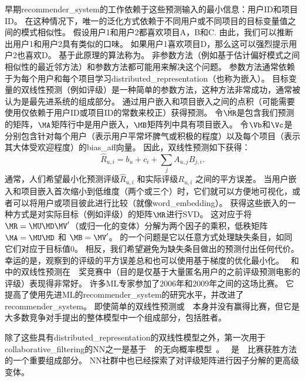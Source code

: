 早期\gls{recommender_system}的工作依赖于这些预测输入的最小信息：用户ID和项目ID。
在这种情况下，唯一的泛化方式依赖于不同用户或不同项目的目标变量值之间的模式相似性。
假设用户1和用户2都喜欢项目A，B和C.
由此，我们可以推断出用户1和用户2具有类似的口味。
如果用户1喜欢项目D，那么这可以强烈提示用户2也喜欢D。
基于此原理的算法称为。
非参数方法（例如基于估计偏好模式之间相似性的最近邻方法）和参数方法都可能用来解决这个问题。
参数方法通常依赖于为每个用户和每个项目学习\gls{distributed_representation}（也称为嵌入）。
目标变量的双线性预测（例如评级）是一种简单的参数方法，这种方法非常成功，通常被认为是最先进系统的组成部分。
通过用户嵌入和项目嵌入之间的点积（可能需要使用仅依赖于用户ID或项目ID的常数来校正）获得预测。
令$\hat{\MR}$是包含我们预测的矩阵，$\MA$矩阵行中是用户嵌入，$\MB$矩阵列中具有项目嵌入。
令$\Vb$和$\Vc$是分别包含针对每个用户（表示用户平常坏脾气或积极的程度）以及每个项目（表示其大体受欢迎程度）的\gls{bias_aff}向量。
因此，双线性预测如下获得：
\begin{equation}
\label{eq:bilinear-prediction}
 \hat{R}_{u,i} = b_u + c_i + \sum_j A_{u,j} B_{j,i}.
\end{equation}
通常，人们希望最小化预测评级$\hat{R}_{u,i}$ 和实际评级${R}_{u,i}$ 之间的平方误差。
当用户嵌入和项目嵌入首次缩小到低维度（两个或三个）时，它们就可以方便地可视化，或者可以将用户或项目彼此进行比较（就像\gls{word_embedding}）。
获得这些嵌入的一种方式是对实际目标（例如评级）的矩阵$\MR$进行\gls{SVD}。
这对应于将$\MR = \MU \MD \MV'$（或归一化的变体）分解为两个因子的乘积，低秩矩阵 $\MA=\MU \MD$ 和 $\MB = \MV'$。
的一个问题是它以任意方式处理缺失条目，如同它们对应于目标值0。
相反，我们希望避免为缺失条目做出的预测付出任何代价。
幸运的是，观察到的评级的平方误差总和也可以使用基于梯度的优化最小化。
~和中的双线性预测在~~奖竞赛中（目的是仅基于大量匿名用户的之前评级预测电影的评级）表现得非常好\citep{bennett2007netflix}。
许多\gls{ML}专家参加了2006年和2009年之间的这场比赛。
它提高了使用先进\gls{ML}的\gls{recommender_system}的研究水平，并改进了\gls{recommender_system}。
即使简单的双线性预测或~~本身并没有赢得比赛，但它是大多数竞争对手提出的整体模型中一个组成部分，包括胜者\citep{BigChaos-Netflix2009,Koren09}。


除了这些具有\gls{distributed_representation}的双线性模型之外，第一次用于\gls{collaborative_filtering}的\gls{NN}之一是基于~~的无向概率模型~\citep{Salakhutdinov-2007-short}。
~是~~比赛获胜方法的一个重要组成部分\citep{BigChaos-Netflix2009,Koren09}。
\gls{NN}社群中也已经探索了对评级矩阵进行因子分解的更高级变体\citep{Salakhutdinov2008-small}。

